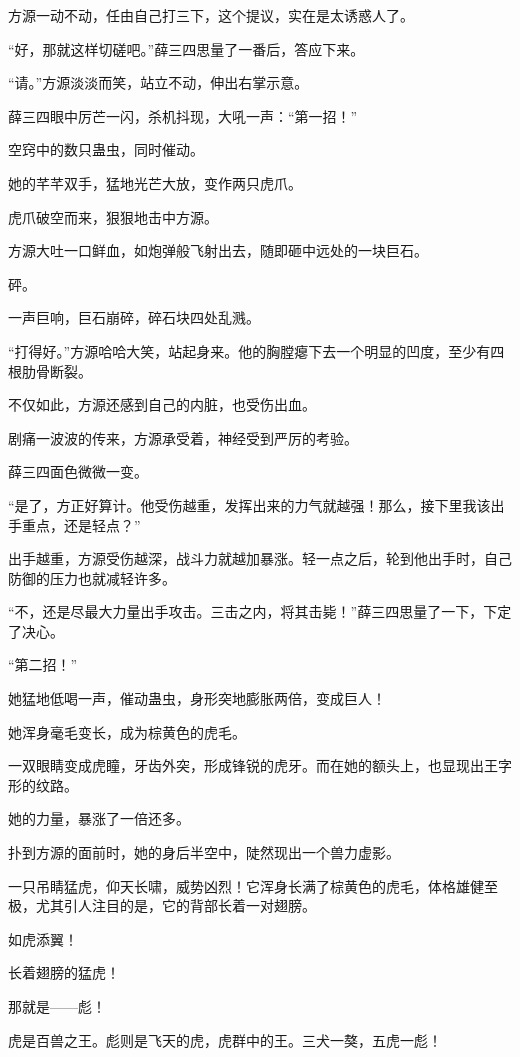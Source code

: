 \begin{this_body}
方源一动不动，任由自己打三下，这个提议，实在是太诱惑人了。

“好，那就这样切磋吧。”薛三四思量了一番后，答应下来。

“请。”方源淡淡而笑，站立不动，伸出右掌示意。

薛三四眼中厉芒一闪，杀机抖现，大吼一声：“第一招！”

空窍中的数只蛊虫，同时催动。

她的芊芊双手，猛地光芒大放，变作两只虎爪。

虎爪破空而来，狠狠地击中方源。

方源大吐一口鲜血，如炮弹般飞射出去，随即砸中远处的一块巨石。

砰。

一声巨响，巨石崩碎，碎石块四处乱溅。

“打得好。”方源哈哈大笑，站起身来。他的胸膛瘪下去一个明显的凹度，至少有四根肋骨断裂。

不仅如此，方源还感到自己的内脏，也受伤出血。

剧痛一波波的传来，方源承受着，神经受到严厉的考验。

薛三四面色微微一变。

“是了，方正好算计。他受伤越重，发挥出来的力气就越强！那么，接下里我该出手重点，还是轻点？”

出手越重，方源受伤越深，战斗力就越加暴涨。轻一点之后，轮到他出手时，自己防御的压力也就减轻许多。

“不，还是尽最大力量出手攻击。三击之内，将其击毙！”薛三四思量了一下，下定了决心。

“第二招！”

她猛地低喝一声，催动蛊虫，身形突地膨胀两倍，变成巨人！

她浑身毫毛变长，成为棕黄色的虎毛。

一双眼睛变成虎瞳，牙齿外突，形成锋锐的虎牙。而在她的额头上，也显现出王字形的纹路。

她的力量，暴涨了一倍还多。

扑到方源的面前时，她的身后半空中，陡然现出一个兽力虚影。

一只吊睛猛虎，仰天长啸，威势凶烈！它浑身长满了棕黄色的虎毛，体格雄健至极，尤其引人注目的是，它的背部长着一对翅膀。

如虎添翼！

长着翅膀的猛虎！

那就是——彪！

虎是百兽之王。彪则是飞天的虎，虎群中的王。三犬一獒，五虎一彪！


\end{this_body}
